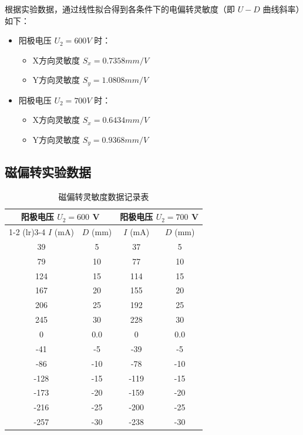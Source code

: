 \documentclass[11pt]{article}
\begin{document}
根据实验数据，通过线性拟合得到各条件下的电偏转灵敏度（即 $U-D$ 曲线斜率）如下：

\begin{itemize}
    \item 阳极电压 $U_2 = {600}{V}$ 时：
    \begin{itemize}
        \item X方向灵敏度 $S_x = {0.7358}{mm/V}$
        \item Y方向灵敏度 $S_y = {1.0808}{mm/V}$
    \end{itemize}
    \item 阳极电压 $U_2 = {700}{V}$ 时：
    \begin{itemize}
        \item X方向灵敏度 $S_x = {0.6434}{mm/V}$
        \item Y方向灵敏度 $S_y = {0.9368}{mm/V}$
    \end{itemize}
\end{itemize}
\subsection{磁偏转实验数据}
\begin{table}[H]
\centering
\caption{磁偏转灵敏度数据记录表}
\label{tab:mag_deflection}
\footnotesize
\setlength{\tabcolsep}{3pt}
\begin{tabular}{cccc}
\toprule
\multicolumn{2}{c}{阳极电压 $U_2 = 600$ V} & \multicolumn{2}{c}{阳极电压 $U_2 = 700$ V} \\
\cmidrule(lr){1-2} \cmidrule(lr){3-4}
$I$ (mA) & $D$ (mm) & $I$ (mA) & $D$ (mm) \\
\midrule
39   & 5   & 37   & 5   \\
79   & 10  & 77   & 10  \\
124  & 15  & 114  & 15  \\
167  & 20  & 155  & 20  \\
206  & 25  & 192  & 25  \\
245  & 30  & 228  & 30  \\
0    & 0.0 & 0    & 0.0 \\
-41  & -5  & -39  & -5  \\
-86  & -10 & -78  & -10 \\
-128 & -15 & -119 & -15 \\
-173 & -20 & -159 & -20 \\
-216 & -25 & -200 & -25 \\
-257 & -30 & -238 & -30 \\
\bottomrule
\end{tabular}
\end{table}
\end{document}

